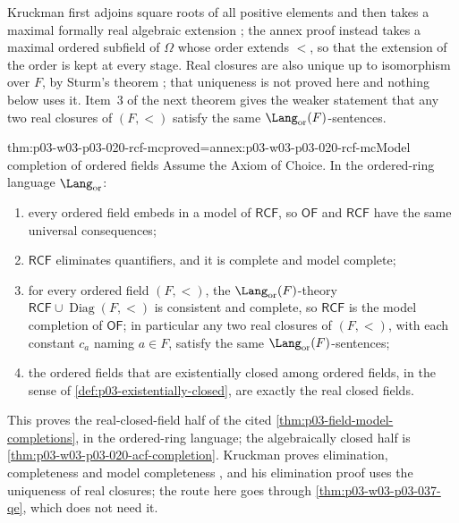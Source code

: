 Kruckman first adjoins square roots of all positive elements and then takes
a maximal formally real algebraic extension
\cite[Lemma~3.27 and Theorem~3.28, p.~36]{Kruckman2020}; the annex proof
instead takes a maximal ordered subfield of \(\Omega\) whose order extends
\(<\), so that the extension of the order is kept at every stage. Real
closures are also unique up to isomorphism over \(F\), by Sturm's theorem
\cite[Theorem~3.38, p.~42]{Kruckman2020}; that uniqueness is not proved here
and nothing below uses it. Item~3 of the next theorem gives the weaker
statement that any two real closures of \((F,<)\) satisfy the same
\(\Lang_{\mathrm{or}}(F)\)-sentences.

\begin{hbtheorem}{thm:p03-w03-p03-020-rcf-mc}{proved=annex:p03-w03-p03-020-rcf-mc}{Model completion of ordered fields}
Assume the Axiom of Choice. In the ordered-ring language
\(\Lang_{\mathrm{or}}\):
\begin{enumerate}
\item every ordered field embeds in a model of \(\mathsf{RCF}\), so
  \(\mathsf{OF}\) and \(\mathsf{RCF}\) have the same universal consequences;
\item \(\mathsf{RCF}\) eliminates quantifiers, and it is complete and model
  complete;
\item for every ordered field \((F,<)\), the
  \(\Lang_{\mathrm{or}}(F)\)-theory
  \(\mathsf{RCF}\cup\operatorname{Diag}(F,<)\) is consistent and complete,
  so \(\mathsf{RCF}\) is the model completion of \(\mathsf{OF}\); in
  particular any two real closures of \((F,<)\), with each constant
  \(c_a\) naming \(a\in F\), satisfy the same
  \(\Lang_{\mathrm{or}}(F)\)-sentences;
\item the ordered fields that are existentially closed among ordered
  fields, in the sense of \cref{def:p03-existentially-closed}, are exactly
  the real closed fields.
\end{enumerate}
\end{hbtheorem}

This proves the real-closed-field half of the cited
\cref{thm:p03-field-model-completions}, in the ordered-ring language; the
algebraically closed half is \cref{thm:p03-w03-p03-020-acf-completion}.
Kruckman proves elimination, completeness and model completeness
\cite[Theorem~3.39, p.~43; Corollary~3.40, p.~44; Theorem~3.46,
p.~46]{Kruckman2020}, and his elimination proof uses the uniqueness of real
closures; the route here goes through \cref{thm:p03-w03-p03-037-qe}, which
does not need it.


